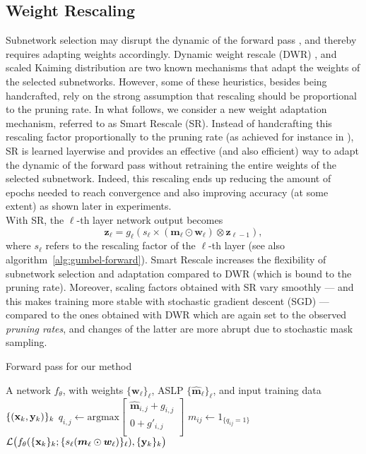   \subsection{Weight Rescaling}
  \label{sec:smart-rescale}
Subnetwork selection may disrupt the dynamic of the forward pass
\cite{DBLP:conf/iccv/HeZRS15,DBLP:conf/cvpr/RamanujanWKFR20}, and thereby
requires adapting  weights accordingly.    Dynamic weight rescale (DWR)
\cite{DBLP:conf/nips/ZhouLLY19}, and scaled Kaiming distribution
\cite{DBLP:conf/cvpr/RamanujanWKFR20}  are two  known mechanisms that adapt the
weights of the selected subnetworks.  However, some of these heuristics, besides
being handcrafted,   rely on the strong assumption that rescaling should be
proportional to the pruning rate.  In what follows,  we consider a new weight
adaptation mechanism, referred to as Smart Rescale (SR). Instead of handcrafting
this rescaling factor proportionally to the pruning rate (as achieved for
instance in \cite{DBLP:conf/nips/ZhouLLY19}), SR is learned layerwise and
provides an effective (and also efficient)  way to adapt the dynamic of the
forward pass without retraining the entire weights of the selected subnetwork.
Indeed, this rescaling ends up reducing the amount of epochs needed to reach
convergence and also improving accuracy (at some extent) as shown later in
experiments. \\ With SR, the $\ell$-th layer network output becomes 
  \begin{equation}
   \mathbf{z}_{\ell} = g_\ell(s_\ell \times (\bm{m}_\ell \odot \bm{w}_\ell) \otimes \mathbf{z}_{\ell-1}),
  \end{equation}
  \noindent where  $s_\ell$ refers to the rescaling factor  of  the $\ell$-th
  layer (see also algorithm~\ref{alg:gumbel-forward}).  Smart Rescale increases
  the flexibility of subnetwork selection and adaptation compared to DWR (which
  is bound to the pruning rate).  Moreover,  scaling factors obtained with SR
  vary smoothly  ---  and this makes training more stable with stochastic
  gradient descent (SGD) --- compared to the ones obtained with DWR which are
  again set to the observed {\it pruning rates},  and changes of the latter are
  more abrupt due to stochastic mask sampling.    
  \begin{algorithm}
    \caption{Forward pass for our method}
    \label{alg:gumbel-forward}
    \begin{algorithmic}[1]
    \REQUIRE A network $f_\theta$, with weights $\{\bm{w}_\ell\}_\ell$, ASLP  $\{\bm{\hat{m}}_\ell\}_\ell$, and input training data $\{({\bf x}_k,{\bf y}_k)\}_k$ 
    \STATE
    $q_{i,j} \gets \text{argmax} 
    \begin{bmatrix}
      \bm{\hat{m}}_{i,j} + g_{i,j} \\
      0 + g'_{i,j}\\
    \end{bmatrix}$  
    \STATE $m_{ij} \gets 1_{\{q_{ij}=1\}}$
     ${\cal L}\big(f_\theta(\{{\bf x}_k\}_k; \{s_\ell (\bm{m}_\ell \odot \bm{w}_\ell)\}_\ell),\{{\bf y}_k\}_k\big)$
    \end{algorithmic}
  \end{algorithm} 
